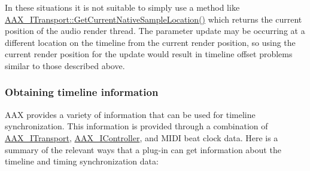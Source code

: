 In these situations it is not suitable to simply use a method like \hyperlink{a00116_a8119233b03774528ffaa519771d792a0}{A\+A\+X\+\_\+\+I\+Transport\+::\+Get\+Current\+Native\+Sample\+Location()} which returns the current position of the audio render thread. The parameter update may be occurring at a different location on the timeline from the current render position, so using the current render position for the update would result in timeline offset problems similar to those described above.\hypertarget{a00351_parameterUpdateTiming_timelineMethods}{}\subsubsection{Obtaining timeline information}\label{a00351_parameterUpdateTiming_timelineMethods}
A\+A\+X provides a variety of information that can be used for timeline synchronization. This information is provided through a combination of \hyperlink{a00116}{A\+A\+X\+\_\+\+I\+Transport}, \hyperlink{a00090}{A\+A\+X\+\_\+\+I\+Controller}, and M\+I\+D\+I beat clock data. Here is a summary of the relevant ways that a plug-\/in can get information about the timeline and timing synchronization data\+:


